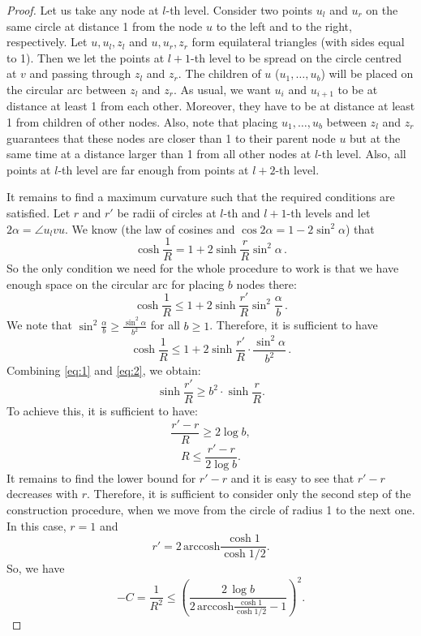 \documentclass[runningheads]{llncs}
\newcommand{\ch}[1]{{\color{red} #1}}
\begin{document}
\begin{proof}
Let us take any node at $l$-th level. Consider two points $u_l$ and $u_r$ on the same circle at distance 1 from the node $u$ to the left and to the right, respectively.
Let $u,u_l,z_l$ and $u,u_r,z_r$ form equilateral triangles (with sides equal to 1). Then we let the points at $l+1$-th level to be spread on the circle centred at $v$ and passing through $z_l$ and $z_r$. The children of $u$ ($u_1, \ldots, u_{b}$) will be placed on the circular arc between $z_l$ and $z_r$. As usual, we want $u_i$ and $u_{i+1}$ to be at distance at least 1 from each other. Moreover, they have to be at distance at least 1 from children of other nodes. Also, note that placing $u_1, \ldots, u_{b}$ between $z_l$ and $z_r$ guarantees that these nodes are closer than 1 to their parent node $u$ but at the same time at a distance larger than 1 from all other nodes at $l$-th level. Also, all points at $l$-th level are far enough from points at $l+2$-th level. 

It remains to find a maximum curvature such that the required conditions are satisfied. Let $r$ and $r'$ be radii of circles at $l$-th and $l+1$-th levels and let $2\alpha = \angle u_l v u$. We know (the law of cosines and $\cos 2\alpha = 1 - 2\sin^2 \alpha$) that
\begin{equation}\label{eq:1}
\cosh \frac{1}{R} = 1 + 2 \sinh \frac{r}{R} \sin^2 \alpha \,.
\end{equation}
\ch{So} the only condition we need for the whole procedure to work is that we have enough space on the circular arc for placing $b$ nodes there:
\[
\cosh \frac{1}{R} \le 1 + 2 \sinh \frac{r'}{R} \sin^2 \frac{\alpha}{b} \,.
\]
\ch{We} note that $\sin^2 \frac{\alpha}{b} \ge \frac{\sin^2 \alpha}{b^2}$ for all $b \ge 1$. Therefore, it is sufficient to have
\begin{equation}\label{eq:2}
\cosh \frac{1}{R} \le 1 + 2 \sinh \frac{r'}{R} \cdot \frac{\sin^2 \alpha}{b^2} \,.
\end{equation}
Combining \eqref{eq:1} and \eqref{eq:2}, we obtain:
\[
\sinh \frac{r'}{R} \ge b^2 \cdot \sinh \frac{r}{R}.
\]
To achieve this, it is sufficient to have: 
\[
\frac{r' - r}{R} \ge 2 \log b,
\]
\[
R \le \frac{r' - r}{2 \log b}.
\]
It remains to find the lower bound for $r' - r$ and it is easy to see that $r' - r$ decreases with $r$. Therefore, it is sufficient to consider only the second step of the construction procedure, when we move from the circle of radius 1 to the next one. In this case, $r = 1$ and 
\[
r' = 2 \, \mathrm{arccosh} \frac{\cosh 1}{\cosh 1/2}.
\]
So, we have 
\[
-C = \frac{1}{R^2} \le \left( \frac{2\,\log b}{2 \, \mathrm{arccosh} \frac{\cosh 1}{\cosh 1/2} - 1} \right)^2.
\]
\end{proof}
\end{document}
